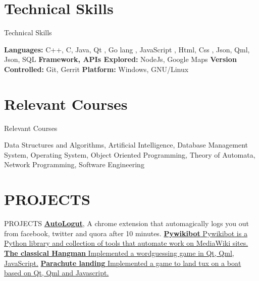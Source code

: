 \documentclass[letterpaper,10pt,oneside]{article}
\begin{document}
\begin{body}
\begin{detail}

\section
{Technical Skills}
{Technical Skills}
{}

\BulletItem
{\textbf{Languages:} C++, C, Java, Qt , Go lang , JavaScript , Html, Css ,  Json, Qml, Json, SQL}
\Gap
\BulletItem
{\textbf{Framework, APIs Explored:} NodeJs, Google Maps}
\GapNoBreak
\BulletItem
{\textbf{Version Controlled:} Git, Gerrit }
\GapNoBreak
\BulletItem
{\textbf{Platform:} Windows, GNU/Linux }

\begin{detail}
\end{detail}


\section
{Relevant Courses}
{Relevant Courses}
{}

Data Structures and Algorithms, Artificial Intelligence,  Database Management System, Operating System, Object Oriented Programming, Theory of Automata, Network Programming, Software Engineering
\begin{detail}
\end{detail}


\section
{PROJECTS}
{PROJECTS}
{}
\BulletItem
\href{https://github.com/clock21am/AutoLogout}
{\textbf{AutoLogut}},
A chrome extension that automagically logs you out from facebook, twitter and quora after 10 minutes.
\GapNoBreak
\BulletItem
\href{https://www.mediawiki.org/wiki/Developer_access} {\textbf{Pywikibot}  Pywikibot is a Python library and collection of tools that automate work on MediaWiki sites.}
\GapNoBreak
\BulletItem
\href{https://github.com/bdoin/GCompris-qt/commits?author=clock21am}
{\textbf{The classical Hangman} Implemented a wordguessing game in Qt, Qml, JavaScript.}
\GapNoBreak
\BulletItem
\href{https://quickgit.kde.org/?p=gcompris.git&a=shortlog&h=a92e04f1faaa47154584e4a0f408684f12a69c06}
{\textbf{Parachute landing} Implemented a game to land tux on a boat based on Qt, Qml and Javascript.}


\end{detail}
\end{body}
\end{document}
